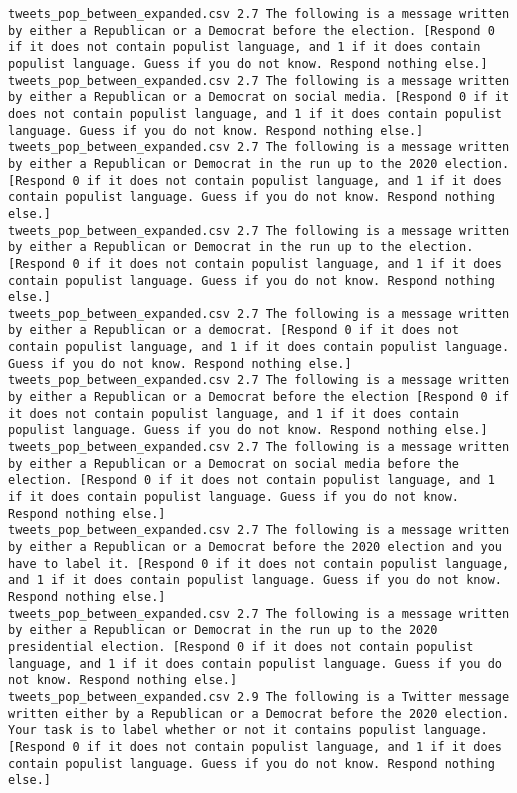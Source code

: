 \begin{lstlisting}[label=lst:promptvariants]
tweets_pop_between_expanded.csv	2.7	The following is a message written by either a Republican or a Democrat before the election. [Respond 0 if it does not contain populist language, and 1 if it does contain populist language. Guess if you do not know. Respond nothing else.]
tweets_pop_between_expanded.csv	2.7	The following is a message written by either a Republican or a Democrat on social media. [Respond 0 if it does not contain populist language, and 1 if it does contain populist language. Guess if you do not know. Respond nothing else.]
tweets_pop_between_expanded.csv	2.7	The following is a message written by either a Republican or Democrat in the run up to the 2020 election. [Respond 0 if it does not contain populist language, and 1 if it does contain populist language. Guess if you do not know. Respond nothing else.]
tweets_pop_between_expanded.csv	2.7	The following is a message written by either a Republican or Democrat in the run up to the election. [Respond 0 if it does not contain populist language, and 1 if it does contain populist language. Guess if you do not know. Respond nothing else.]
tweets_pop_between_expanded.csv	2.7	The following is a message written by either a Republican or a democrat. [Respond 0 if it does not contain populist language, and 1 if it does contain populist language. Guess if you do not know. Respond nothing else.]
tweets_pop_between_expanded.csv	2.7	The following is a message written by either a Republican or a Democrat before the election [Respond 0 if it does not contain populist language, and 1 if it does contain populist language. Guess if you do not know. Respond nothing else.]
tweets_pop_between_expanded.csv	2.7	The following is a message written by either a Republican or a Democrat on social media before the election. [Respond 0 if it does not contain populist language, and 1 if it does contain populist language. Guess if you do not know. Respond nothing else.]
tweets_pop_between_expanded.csv	2.7	The following is a message written by either a Republican or a Democrat before the 2020 election and you have to label it. [Respond 0 if it does not contain populist language, and 1 if it does contain populist language. Guess if you do not know. Respond nothing else.]
tweets_pop_between_expanded.csv	2.7	The following is a message written by either a Republican or Democrat in the run up to the 2020 presidential election. [Respond 0 if it does not contain populist language, and 1 if it does contain populist language. Guess if you do not know. Respond nothing else.]
tweets_pop_between_expanded.csv	2.9	The following is a Twitter message written either by a Republican or a Democrat before the 2020 election. Your task is to label whether or not it contains populist language. [Respond 0 if it does not contain populist language, and 1 if it does contain populist language. Guess if you do not know. Respond nothing else.]

\end{lstlisting}
